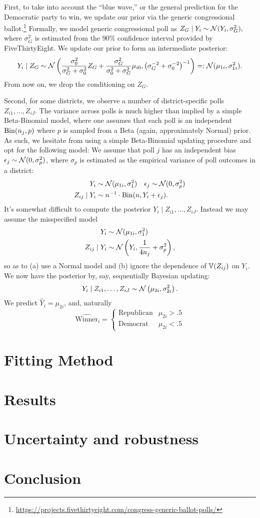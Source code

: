 \documentclass[11pt]{article}
\begin{document}
First, to take into account the ``blue wave,'' or the general prediction for the Democratic party to win, we update our prior via the generic congressional ballot.\footnote{\url{https://projects.fivethirtyeight.com/congress-generic-ballot-polls/}} Formally, we model generic congressional poll as $Z_{G} \mid Y_i \sim \mathcal{N}(Y_i, \sigma_G^2),$ where $\sigma_G^2$ is estimated from the 90\% confidence interval provided by FiveThirtyEight. We update our prior to form an intermediate posterior: \[
Y_i \mid Z_G \sim \mathcal{N} \left({
    \frac{\sigma_0^2}{\sigma_G^2 + \sigma_0^2} Z_G + \frac{\sigma_G^2}{ \sigma_0^2 + \sigma_G^2} \mu_{i0}, \left({\sigma_G^{-2} + \sigma_0^{-2}}\right)^{-1}
}\right) =: \mathcal{N}(\mu_{1i}, \sigma_{1i}^2).
\]
From now on, we drop the conditioning on $Z_G$.

Second, for some districts, we observe a number of district-specific polls $Z_{i1},\ldots,Z_{iJ}$. The variance across polls is much higher than implied by a simple Beta-Binomial model, where one assumes that each poll is an independent $\operatorname{Bin}(n_j,p)$ where $p$ is sampled from a Beta (again, approximately Normal) prior. As such, we hesitate from using a simple Beta-Binomial updating procedure and opt for the following model: We assume that poll $j$ has an independent bias $\epsilon_j \sim \mathcal{N}(0, \sigma^2_p)$, where $\sigma_p$ is estimated as the empirical variance of poll outcomes in a district: \begin{align*}
Y_i &\sim \mathcal{N}(\mu_{1i}, \sigma^2_{1}) \quad \epsilon_j \sim \mathcal{N}(0, \sigma_p^2) \\
Z_{ij}\mid Y_i &\sim n^{-1} \cdot \operatorname{Bin}(n, Y_i + \epsilon_j).
\end{align*}
It's somewhat difficult to compute the posterior $Y_i \mid Z_{i1}, \ldots, Z_{iJ}$. Instead we may assume the misspecified model \begin{align*}
Y_i &\sim \mathcal{N}(\mu_{1i}, \sigma_{1}^2) \\
Z_{ij} \mid Y_i &\sim \mathcal{N}\left({Y_i, \frac{1}{4n_j} + \sigma_p^2}\right),
\end{align*}
so as to (a) use a Normal model and (b) ignore the dependence of $\mathbb{V}(Z_{ij})$ on $Y_i$. We now have the posterior by, say, sequentially Bayesian updating: \[
Y_i \mid Z_{i1},\ldots,Z_{iJ} \sim \mathcal{N}\left({
    \mu_{2i}, \sigma_{2i}^2
}\right).
\]
We predict $\hat Y_i = \mu_{2i}$, and, naturally \[
\hat{\text{Winner}}_i = \begin{cases}
    \text{Republican} & \mu_{2i} > .5 \\
    \text{Democrat} & \mu_{2i} < .5
\end{cases}
\]

    
\section{Fitting Method}

\section{Results}

\section{Uncertainty and robustness}

\section{Conclusion}
\end{document}
